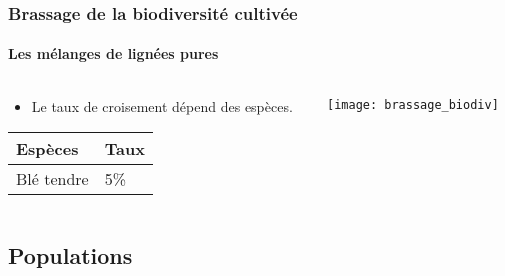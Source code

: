 \begin{frame}
\frametitle{Brassage de la biodiversité cultivée}
\framesubtitle{Les mélanges de lignées pures}

\begin{columns}
\begin{column}{.3\textwidth}

\begin{itemize}
\item Le taux de croisement dépend des espèces.
\end{itemize}

\begin{center}
\begin{tabular}{ p{} p{} }
\hline
Espèces & Taux \\
\hline
Blé tendre & 5\% \\
\hline
\end{tabular}	
\end{center}

\end{column}

\begin{column}{.7\textwidth}
\texttt{[image: brassage\_biodiv]}
\end{column}
\end{columns}

\end{frame}




\subsection{Populations}


